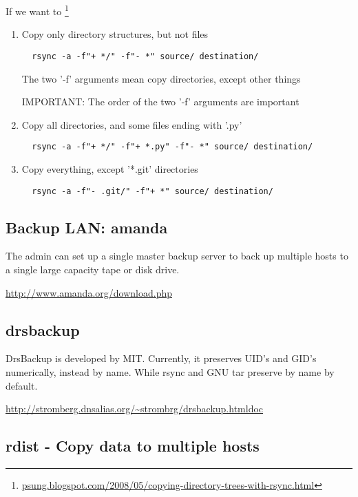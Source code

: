 If we want to
\footnote{\url{psung.blogspot.com/2008/05/copying-directory-trees-with-rsync.html}}
\begin{enumerate}
  \item Copy only directory structures, but not files
  \begin{verbatim}
  rsync -a -f"+ */" -f"- *" source/ destination/
  \end{verbatim}
  The two '-f' arguments mean copy directories, except other things
  
  IMPORTANT: The order of the two '-f' arguments are important 
  
  \item Copy all directories, and some files ending with '.py'
  \begin{verbatim}
  rsync -a -f"+ */" -f"+ *.py" -f"- *" source/ destination/
  \end{verbatim}
  
  \item Copy everything, except '*.git' directories
  \begin{verbatim}
  rsync -a -f"- .git/" -f"+ *" source/ destination/
  \end{verbatim}
\end{enumerate}

\subsection{Backup LAN: amanda}

The admin can set up a single master backup server to back up multiple hosts to
a single large capacity tape or disk drive.


\url{http://www.amanda.org/download.php}

\subsection{drsbackup}

DrsBackup is developed by MIT. Currently, it preserves UID's and GID's
numerically, instead by name. While rsync and GNU tar preserve by name by
default. 

\url{http://stromberg.dnsalias.org/~strombrg/drsbackup.htmldoc}


\subsection{rdist - Copy data to multiple hosts}

